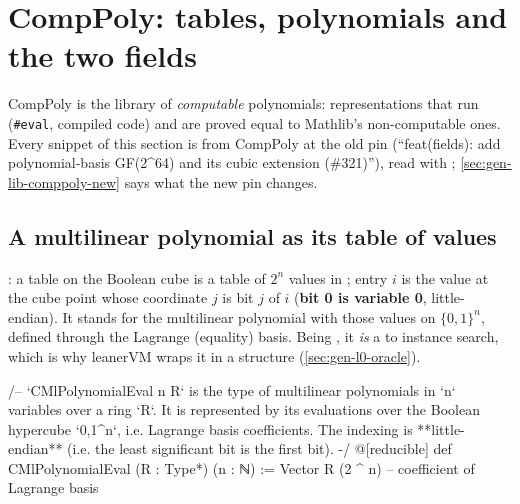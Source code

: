 \begingroup\sloppy
\section{CompPoly: tables, polynomials and the two fields}\label{sec:gen-lib-comppoly}

CompPoly is the library of \emph{computable} polynomials: representations that run
(\texttt{\#eval}, compiled code) and are proved equal to Mathlib's non-computable ones. Every snippet
of this section is from CompPoly at the old pin  (\enquote{feat(fields): add
polynomial-basis GF(2\textasciicircum 64) and its cubic extension (\#321)}), read with
; \cref{sec:gen-lib-comppoly-new} says what the new pin
 changes.

\subsection{A multilinear polynomial as its table of values}\label{sec:gen-lib-comppoly-mle}

\begin{define}{: a table on the Boolean cube}
 is a table of $2^n$ values in ; entry $i$ is the value at the
cube point whose coordinate $j$ is bit $j$ of $i$ (\textbf{bit 0 is variable 0}, little-endian).
It stands for the multilinear polynomial with those values on $\{0,1\}^n$, defined through the
Lagrange (equality) basis. Being , it \emph{is} a  to instance
search, which is why leanerVM wraps it in a structure 
(\cref{sec:gen-l0-oracle}).
\end{define}

\begin{leancode}
/-- `CMlPolynomialEval n R` is the type of multilinear polynomials in `n` variables over a ring `R`.
  It is represented by its evaluations over the Boolean hypercube `{0,1}^n`,
  i.e. Lagrange basis coefficients.
  The indexing is **little-endian** (i.e. the least significant bit is the first bit). -/
@[reducible]
def CMlPolynomialEval (R : Type*) (n : ℕ) := Vector R (2 ^ n) -- coefficient of Lagrange basis
\end{leancode}



